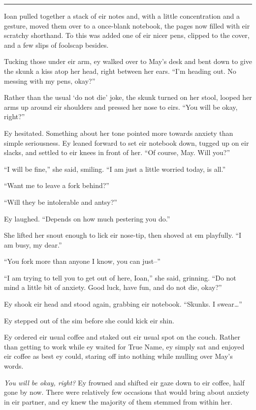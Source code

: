 \begin{center}\rule{0.5\linewidth}{0.5pt}\end{center}

Ioan pulled together a stack of eir notes and, with a little concentration and a gesture, moved them over to a once-blank notebook, the pages now filled with eir scratchy shorthand. To this was added one of eir nicer pens, clipped to the cover, and a few slips of foolscap besides.

Tucking those under eir arm, ey walked over to May's desk and bent down to give the skunk a kiss atop her head, right between her ears. ``I'm heading out. No messing with my pens, okay?''

Rather than the usual `do not die' joke, the skunk turned on her stool, looped her arms up around eir shoulders and pressed her nose to eirs. ``You will be okay, right?''

Ey hesitated. Something about her tone pointed more towards anxiety than simple seriousness. Ey leaned forward to set eir notebook down, tugged up on eir slacks, and settled to eir knees in front of her. ``Of course, May. Will you?''

``I will be fine,'' she said, smiling. ``I am just a little worried today, is all.''

``Want me to leave a fork behind?''

``Will they be intolerable and antsy?''

Ey laughed. ``Depends on how much pestering you do.''

She lifted her snout enough to lick eir nose-tip, then shoved at em playfully. ``I am busy, my dear.''

``You fork more than anyone I know, you can just--''

``I am trying to tell you to get out of here, Ioan,'' she said, grinning. ``Do not mind a little bit of anxiety. Good luck, have fun, and do not die, okay?''

Ey shook eir head and stood again, grabbing eir notebook. ``Skunks. I swear\ldots{}''

Ey stepped out of the sim before she could kick eir shin.

Ey ordered eir usual coffee and staked out eir usual spot on the couch. Rather than getting to work while ey waited for True Name, ey simply sat and enjoyed eir coffee as best ey could, staring off into nothing while mulling over May's words.

\emph{You will be okay, right?} Ey frowned and shifted eir gaze down to eir coffee, half gone by now. There were relatively few occasions that would bring about anxiety in eir partner, and ey knew the majority of them stemmed from within her.

